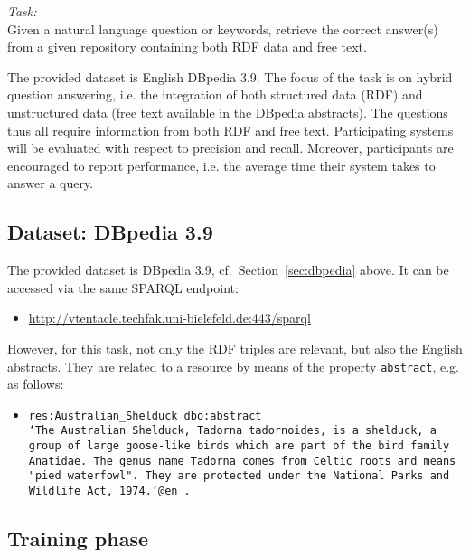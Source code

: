 
\emph{Task:} \\
Given a natural language question or keywords, retrieve the correct answer(s) from a given repository containing both RDF data and free text. 

The provided dataset is English DBpedia 3.9. 
The focus of the task is on hybrid question answering, i.e. the integration of both structured data (RDF) and unstructured data 
(free text available in the DBpedia abstracts). 
The questions thus all require information from both RDF and free text. 
Participating systems will be evaluated with respect to precision and recall. 
Moreover, participants are encouraged to report performance, i.e. the average time their system takes to answer a query.


\subsection{Dataset: DBpedia 3.9}

The provided dataset is DBpedia 3.9, cf.~Section~\ref{sec:dbpedia} above. 
It can be accessed via the same SPARQL endpoint:
\begin{itemize} 
\item[] \url{http://vtentacle.techfak.uni-bielefeld.de:443/sparql}
\end{itemize}

However, for this task, not only the RDF triples are relevant, but also the English abstracts. 
They are related to a resource by means of the property \texttt{abstract}, e.g. as follows:

\begin{itemize}
\item[] \texttt{res:Australian\_Shelduck dbo:abstract \\[.1cm]
    `The Australian Shelduck, Tadorna tadornoides, is a shelduck, \\ 
     a group of large goose-like birds which are part of the bird \\ 
     family Anatidae. The genus name Tadorna comes from Celtic \\ 
     roots and means "pied waterfowl". They are protected under \\ 
     the National Parks and Wildlife Act, 1974.'@en .}
\end{itemize}

\subsection{Training phase}

